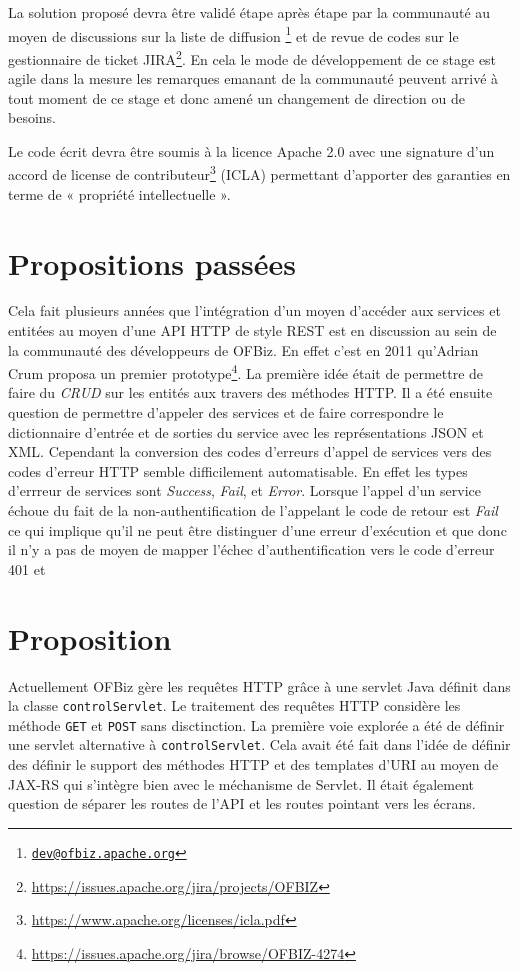 \documentclass[a4paper, 11pt]{report}
\begin{document}
La solution proposé devra être validé étape après étape par la
communauté au moyen de discussions sur la liste de diffusion
\footnote{\href{mailto:dev@ofbiz.apache.org}{\nolinkurl{dev@ofbiz.apache.org}}}
et de revue de codes sur le gestionnaire de ticket
JIRA\footnote{\url{https://issues.apache.org/jira/projects/OFBIZ}}. En
cela le mode de développement de ce stage est agile dans la mesure les
remarques emanant de la communauté peuvent arrivé à tout moment de ce
stage et donc amené un changement de direction ou de besoins.

Le code écrit devra être soumis à la licence Apache 2.0 avec une
signature d'un accord de license de
contributeur\footnote{\url{https://www.apache.org/licenses/icla.pdf}} (ICLA)
permettant d'apporter des garanties en terme de « propriété
intellectuelle ».

\section{Propositions passées}

Cela fait plusieurs années que l'intégration d'un moyen d'accéder aux
services et entitées au moyen d'une API HTTP de style REST est en
discussion au sein de la communauté des développeurs de OFBiz.  En
effet c'est en 2011 qu'Adrian Crum proposa un premier
prototype\footnote{\url{https://issues.apache.org/jira/browse/OFBIZ-4274}}. La
première idée était de permettre de faire du \emph{CRUD} sur les
entités aux travers des méthodes HTTP.  Il a été ensuite question de
permettre d'appeler des services et de faire correspondre le
dictionnaire d'entrée et de sorties du service avec les
représentations JSON et XML.  Cependant la conversion des codes
d'erreurs d'appel de services vers des codes d'erreur HTTP semble
difficilement automatisable.  En effet les types d'errreur de services
sont \emph{Success}, \emph{Fail}, et \emph{Error}.  Lorsque l'appel
d'un service échoue du fait de la non-authentification de l'appelant
le code de retour est \emph{Fail} ce qui implique qu'il ne peut être
distinguer d'une erreur d'exécution et que donc il n'y a pas de moyen
de mapper l'échec d'authentification vers le code d'erreur 401 et

\section{Proposition}

Actuellement OFBiz gère les requêtes HTTP grâce à une servlet Java
\cite{Chan2017servlet} définit dans la classe \verb=controlServlet=.
Le traitement des requêtes HTTP considère les méthode \verb=GET= et
\verb=POST= sans disctinction.  La première voie explorée a été de
définir une servlet alternative à \verb=controlServlet=.  Cela avait
été fait dans l'idée de définir des définir le support des méthodes
HTTP et des templates d'URI au moyen de JAX-RS qui s'intègre bien avec
le méchanisme de Servlet.  Il était également question de séparer les
routes de l'API et les routes pointant vers les écrans.
\end{document}
